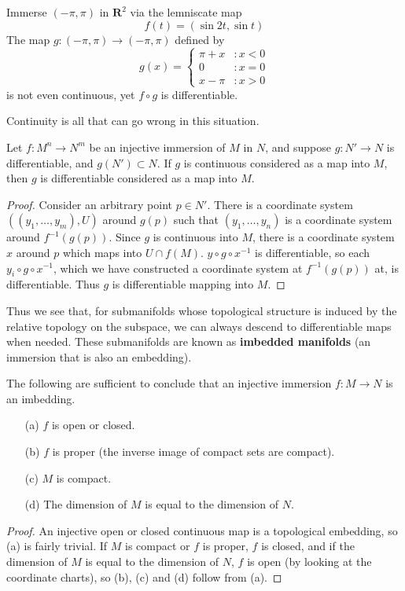 \begin{example}
    Immerse $(-\pi, \pi)$ in $\mathbf{R}^2$ via the lemniscate map
    \[ f(t) = (\sin 2t, \sin t) \]
    The map $g:(-\pi, \pi) \to (-\pi, \pi)$ defined by
    \[ g(x) = \begin{cases} \pi + x &: x < 0 \\ 0 &: x = 0 \\ x - \pi &: x > 0 \end{cases} \]
    is not even continuous, yet $f \circ g$ is differentiable.
\end{example}

Continuity is all that can go wrong in this situation.

\begin{theorem}
    Let $f:M^n \to N^m$ be an injective immersion of $M$ in $N$, and suppose $g: N' \to N$ is differentiable, and $g(N') \subset N$. If $g$ is continuous considered as a map into $M$, then $g$ is differentiable considered as a map into $M$.
\end{theorem}
\begin{proof}
    Consider an arbitrary point $p \in N'$. There is a coordinate system $((y_1, \dots, y_m),U)$ around $g(p)$ such that $(y_1, \dots, y_n)$ is a coordinate system around $f^{-1}(g(p))$. Since $g$ is continuous into $M$, there is a coordinate system $x$ around $p$ which maps into $U \cap f(M)$. $y \circ g \circ x^{-1}$ is differentiable, so each $y_i \circ g \circ x^{-1}$, which we have constructed a coordinate system at $f^{-1}(g(p))$ at, is differentiable. Thus $g$ is differentiable mapping into $M$.
\end{proof}

Thus we see that, for submanifolds whose topological structure is induced by the relative topology on the subspace, we can always descend to differentiable maps when needed. These submanifolds are known as {\bf imbedded manifolds} (an immersion that is also an embedding).

\begin{theorem}
    The following are sufficient to conclude that an injective immersion $f: M \to N$ is an imbedding.
    \begin{enumerate}
        \item[(a)] $f$ is open or closed.
        \item[(b)] $f$ is proper (the inverse image of compact sets are compact).
        \item[(c)] $M$ is compact.
        \item[(d)] The dimension of $M$ is equal to the dimension of $N$.
    \end{enumerate}
\end{theorem}
\begin{proof}
    An injective open or closed continuous map is a topological embedding, so (a) is fairly trivial. If $M$ is compact or $f$ is proper, $f$ is closed, and if the dimension of $M$ is equal to the dimension of $N$, $f$ is open (by looking at the coordinate charts), so (b), (c) and (d) follow from (a).
\end{proof}

